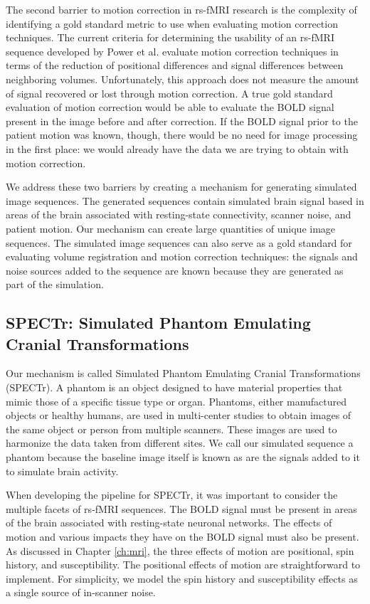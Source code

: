 The second barrier to motion correction in rs-fMRI research is the complexity of identifying a gold standard metric to use when evaluating motion correction techniques. The current criteria for determining the usability of an rs-fMRI sequence developed by Power et al. evaluate motion correction techniques in terms of the reduction of positional differences and signal differences between neighboring volumes. Unfortunately, this approach does not measure the amount of signal recovered or lost through motion correction. A true gold standard evaluation of motion correction would be able to evaluate the BOLD signal present in the image before and after correction. If the BOLD signal prior to the patient motion was known, though, there would be no need for image processing in the first place: we would already have the data we are trying to obtain with motion correction.

We address these two barriers by creating a mechanism for generating simulated image sequences. The generated sequences contain simulated brain signal based in areas of the brain associated with resting-state connectivity, scanner noise, and patient motion. Our mechanism can create large quantities of unique image sequences. The simulated image sequences can also serve as a gold standard for evaluating volume registration and motion correction techniques: the signals and noise sources added to the sequence are known because they are generated as part of the simulation.

\subsection{SPECTr: Simulated Phantom Emulating Cranial Transformations}

Our mechanism is called Simulated Phantom Emulating Cranial Transformations \\(SPECTr). A phantom is an object designed to have material properties that mimic those of a specific tissue type or organ. Phantoms, either manufactured objects or healthy humans, are used in multi-center studies to obtain images of the same object or person from multiple scanners. These images are used to harmonize the data taken from different sites. We call our simulated sequence a phantom because the baseline image itself is known as are the signals added to it to simulate brain activity. 

When developing the pipeline for SPECTr, it was important to consider the multiple facets of rs-fMRI sequences. The BOLD signal must be present in areas of the brain associated with resting-state neuronal networks. The effects of motion and various impacts they have on the BOLD signal must also be present. As discussed in Chapter \ref{ch:mri}, the three effects of motion are positional, spin history, and susceptibility. The positional effects of motion are straightforward to implement. For simplicity, we model the spin history and susceptibility effects as a single source of in-scanner noise. 

